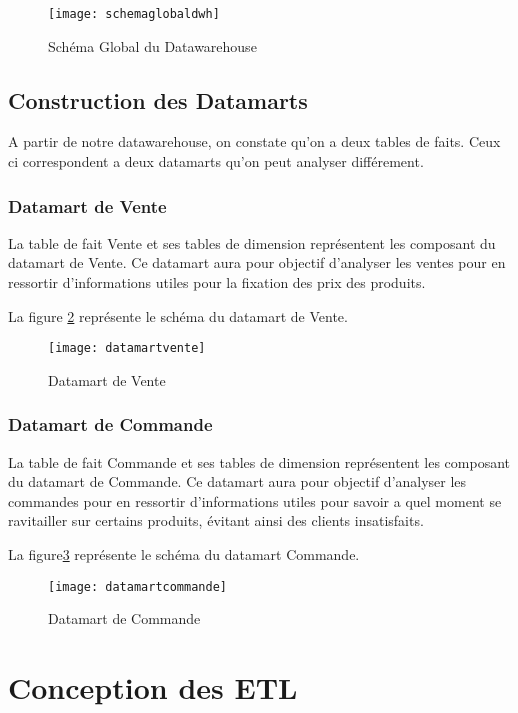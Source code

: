 \begin{figure}[H]
    \centering
    \texttt{[image: schemaglobaldwh]}
    \caption{Schéma Global du Datawarehouse}
    \label{fig:schemaglobaldwh}
\end{figure}

\subsection{Construction des Datamarts}
A partir de notre datawarehouse, on constate qu'on a deux tables de faits. Ceux ci correspondent a deux datamarts qu'on peut analyser différement.

\subsubsection{Datamart de Vente}
La table de fait Vente et ses tables de dimension représentent les composant du datamart de Vente. Ce datamart aura pour objectif d'analyser les ventes pour en ressortir d'informations utiles pour la fixation des prix des produits.

La figure \ref{fig:datamartvente} représente le schéma du datamart de Vente.

\begin{figure}[H]
    \centering
    \texttt{[image: datamartvente]}
    \caption{Datamart de Vente}
    \label{fig:datamartvente}
\end{figure}

\subsubsection{Datamart de Commande}
La table de fait Commande et ses tables de dimension représentent les composant du datamart de Commande. Ce datamart aura pour objectif d'analyser les commandes pour en ressortir d'informations utiles pour savoir a quel moment se ravitailler sur certains produits, évitant ainsi des clients insatisfaits.

La figure\ref{fig:datamartcommande} représente le schéma du datamart Commande.
 
\begin{figure}[H]
    \centering
    \texttt{[image: datamartcommande]}
    \caption{Datamart de Commande}
    \label{fig:datamartcommande}
\end{figure}

\section{Conception des ETL}


